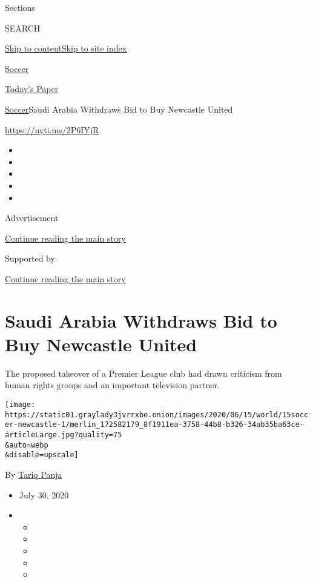 Sections

SEARCH

\protect\hyperlink{site-content}{Skip to
content}\protect\hyperlink{site-index}{Skip to site index}

\href{https://www.nytimes3xbfgragh.onion/section/sports/soccer}{Soccer}

\href{https://myaccount.nytimes3xbfgragh.onion/auth/login?response_type=cookie\&client_id=vi}{}

\href{https://www.nytimes3xbfgragh.onion/section/todayspaper}{Today's
Paper}

\href{/section/sports/soccer}{Soccer}\textbar{}Saudi Arabia Withdraws
Bid to Buy Newcastle United

\url{https://nyti.ms/2P6IYjR}

\begin{itemize}
\item
\item
\item
\item
\item
\end{itemize}

Advertisement

\protect\hyperlink{after-top}{Continue reading the main story}

Supported by

\protect\hyperlink{after-sponsor}{Continue reading the main story}

\hypertarget{saudi-arabia-withdraws-bid-to-buy-newcastle-united}{%
\section{Saudi Arabia Withdraws Bid to Buy Newcastle
United}\label{saudi-arabia-withdraws-bid-to-buy-newcastle-united}}

The proposed takeover of a Premier League club had drawn criticism from
human rights groups and an important television partner.

\texttt{[image: https://static01.graylady3jvrrxbe.onion/images/2020/06/15/world/15soccer-newcastle-1/merlin\_172582179\_8f1911ea-3758-44b8-b326-34ab35ba63ce-articleLarge.jpg?quality=75\\\&auto=webp\\\&disable=upscale]}

By \href{https://www.nytimes3xbfgragh.onion/by/tariq-panja}{Tariq Panja}

\begin{itemize}
\item
  July 30, 2020
\item
  \begin{itemize}
  \item
  \item
  \item
  \item
  \item
  \end{itemize}
\end{itemize}

